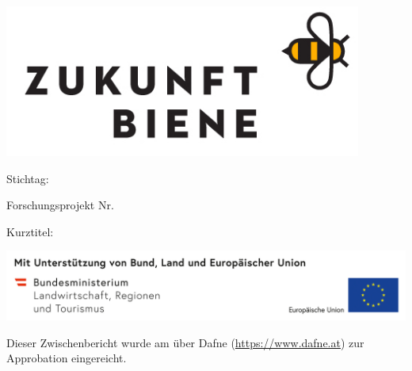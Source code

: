 \begin{titlepage}

\begin{center}

\includegraphics[height=50mm]{figures/logos/zukunft_biene_logo_rechteck}

\vfill\vfill\vfill
\vfill\vfill\vfill

{\bfseries\large\mysubtitle}
\vfill
{\bfseries\large\mysubject}
\vfill
Stichtag: \mydeadlinedate

\vfill\vfill\vfill

Forschungsprojekt Nr. \myprojectnumber

\vfill\vfill\vfill
\vfill\vfill\vfill

{\LARGE\textbf{\mytitle}\par}

\vfill
Kurztitel: {\bfseries\large\mysubtitle}

\vfill\vfill\vfill

\vspace*{\fill}
\includegraphics[width=\textwidth]{figures/logos/5_Foeg_Leiste_Bund+Land+EU_2020_RGB_leer}

\newpage

\vspace*{\fill}

Dieser Zwischenbericht wurde am {\mysubmissiondate} über Dafne (\url{https://www.dafne.at}) zur Approbation eingereicht. 

\end{center}
\end{titlepage}
